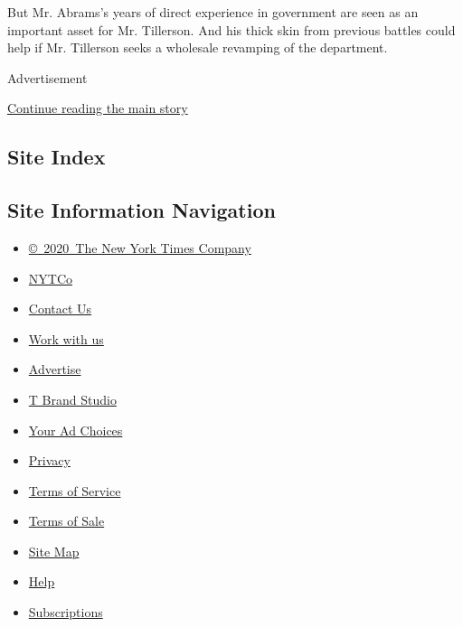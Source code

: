 But Mr. Abrams's years of direct experience in government are seen as an
important asset for Mr. Tillerson. And his thick skin from previous
battles could help if Mr. Tillerson seeks a wholesale revamping of the
department.

Advertisement

\protect\hyperlink{after-bottom}{Continue reading the main story}

\hypertarget{site-index}{%
\subsection{Site Index}\label{site-index}}

\hypertarget{site-information-navigation}{%
\subsection{Site Information
Navigation}\label{site-information-navigation}}

\begin{itemize}
\tightlist
\item
  \href{https://help.nytimes.com/hc/en-us/articles/115014792127-Copyright-notice}{©~2020~The
  New York Times Company}
\end{itemize}

\begin{itemize}
\tightlist
\item
  \href{https://www.nytco.com/}{NYTCo}
\item
  \href{https://help.nytimes.com/hc/en-us/articles/115015385887-Contact-Us}{Contact
  Us}
\item
  \href{https://www.nytco.com/careers/}{Work with us}
\item
  \href{https://nytmediakit.com/}{Advertise}
\item
  \href{http://www.tbrandstudio.com/}{T Brand Studio}
\item
  \href{https://www.nytimes.com/privacy/cookie-policy\#how-do-i-manage-trackers}{Your
  Ad Choices}
\item
  \href{https://www.nytimes.com/privacy}{Privacy}
\item
  \href{https://help.nytimes.com/hc/en-us/articles/115014893428-Terms-of-service}{Terms
  of Service}
\item
  \href{https://help.nytimes.com/hc/en-us/articles/115014893968-Terms-of-sale}{Terms
  of Sale}
\item
  \href{https://spiderbites.nytimes.com}{Site Map}
\item
  \href{https://help.nytimes.com/hc/en-us}{Help}
\item
  \href{https://www.nytimes.com/subscription?campaignId=37WXW}{Subscriptions}
\end{itemize}
